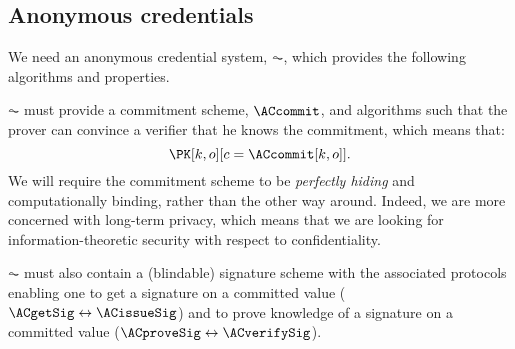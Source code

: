 \subsection{Anonymous credentials}%
\label{ZK-anon-cred}



We need an anonymous credential system, \(\AC\), which provides the following algorithms and properties.


\(\AC\) must provide a commitment scheme, \(\ACcommit\), and algorithms such that the prover can convince a verifier that he knows the commitment, which means that:
\begin{equation*}
  \PK[k, o][c = \ACcommit[k,o]].
\end{equation*}
We will require the commitment scheme to be \emph{perfectly hiding} and computationally binding, rather than the other way around.
Indeed, we are more concerned with long-term privacy, which means that we are looking for information-theoretic security with respect to confidentiality.


\(\AC\) must also contain a (blindable) signature scheme with the associated protocols enabling one to get a signature on a committed value (\(\ACgetSig\leftrightarrow \ACissueSig\)) and to prove knowledge of a signature on a committed value (\(\ACproveSig\leftrightarrow \ACverifySig\)).

